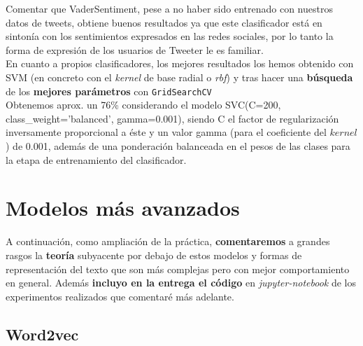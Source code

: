 \documentclass[a4paper,12pt]{report}
\begin{document}
Comentar que VaderSentiment, pese a no haber sido entrenado con nuestros datos de tweets, obtiene buenos resultados ya que este clasificador está en sintonía con los sentimientos expresados en las redes sociales, por lo tanto la forma de expresión de los usuarios de Tweeter le es familiar.
\vspace{2mm}\\
En cuanto a propios clasificadores, los mejores resultados los hemos obtenido con SVM (en concreto con el \textit{kernel} de base radial o \textit{rbf}) y tras hacer una \textbf{búsqueda} de los \textbf{mejores parámetros} con \texttt{GridSearchCV} 
\vspace{2mm}\\
Obtenemos aprox. un 76\% considerando el modelo SVC(C=200, class\_weight='balanced', gamma=0.001), siendo C el factor de regularización inversamente proporcional a éste y un valor gamma  (para el coeficiente del $kernel$) de 0.001, además de una ponderación balanceada en el pesos de las clases para la etapa de entrenamiento del clasificador.


\clearpage

\section{Modelos más avanzados}

A continuación, como ampliación de la práctica, \textbf{comentaremos} a grandes rasgos la \textbf{teoría} subyacente por debajo de estos modelos y formas de representación del texto que son más complejas pero con mejor comportamiento en general. Además \textbf{incluyo en la entrega el código} en \textit{jupyter-notebook} de los experimentos realizados que comentaré más adelante.


\subsection{Word2vec}
\end{document}
